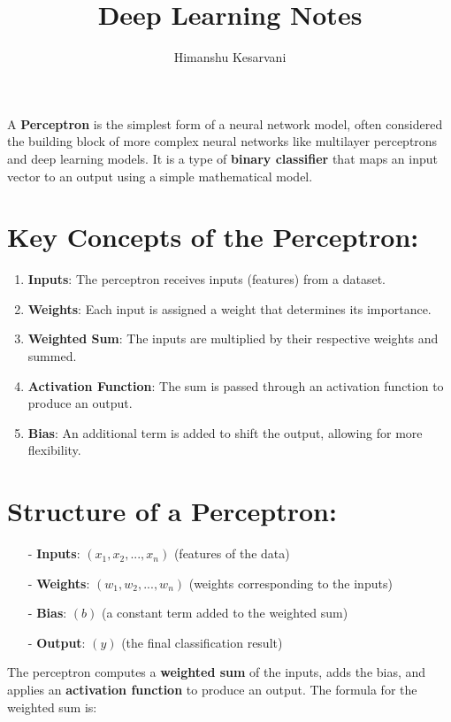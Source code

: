\documentclass[10pt]{article}
\begin{document}
\title{Deep Learning Notes}
\author{Himanshu Kesarvani}
\maketitle
A {\bf Perceptron} is the simplest form of a neural network model, often considered the building block of 
more complex neural networks like multilayer perceptrons and deep learning models. It is a type of 
{\bf binary classifier} that maps an input vector to an output using a simple mathematical model.

\section{ Key Concepts of the Perceptron:}

\begin{enumerate}
   \item {\bf Inputs}: The perceptron receives inputs (features) from a dataset.
   \item {\bf Weights}: Each input is assigned a weight that determines its importance.
   \item {\bf Weighted Sum}: The inputs are multiplied by their respective weights and summed.
   \item {\bf Activation Function}: The sum is passed through an activation function to produce an output.
   \item {\bf Bias}: An additional term is added to shift the output, allowing for more flexibility.
\end{enumerate}

\section{ Structure of a Perceptron:}

\begin{enumerate}
   \item [-] {\bf Inputs}: $(x_1, x_2, ..., x_n)$ (features of the data)
   \item [-] {\bf Weights}: $(w_1, w_2, ..., w_n)$ (weights corresponding to the inputs)
   \item [-] {\bf Bias}: $(b)$ (a constant term added to the weighted sum)
   \item [-] {\bf Output}: $(y)$ (the final classification result)
\end{enumerate}

The perceptron computes a {\bf weighted sum} of the inputs, adds the bias, and applies an 
{\bf activation function} to produce an output. The formula for the weighted sum is:
\end{document}

